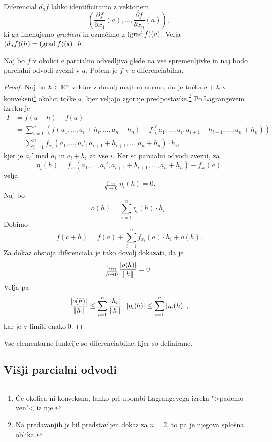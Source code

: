 \begin{opomba}
Diferencial $d_af$ lahko identificiramo z vektorjem
\[
\left(
	\frac{\partial f}{\partial x_1}(a),
	\dots,
	\frac{\partial f}{\partial x_n}(a)
\right),
\]
ki ga imenujemo \emph{gradient} in
označimo z $(\operatorname{grad} f)(a)$. Velja
$(d_af)(h) = (\operatorname{grad} f)(a) \cdot h$.
\end{opomba}

\begin{izrek}
Naj bo $f$ v okolici $a$ parcialno odvedljiva glede na vse
spremenljivke in naj bodo parcialni odvodi zvezni v $a$. Potem je
$f$ v $a$ diferenciabilna.
\end{izrek}

\begin{proof}
Naj bo $h \in \mathbb{R}^n$ vektor z dovolj majhno normo, da je točka $a+h$
v konveksni\footnote{Če okolica ni konveksna, lahko pri uporabi
Lagrangevega izreka ">pademo ven"< iz nje.} okolici točke $a$, kjer
veljajo zgornje predpostavke.\footnote{Na predavanjih je bil
predstavljen dokaz za $n=2$, to pa je njegova splošna oblika.} Po
Lagrangevem izreku je
\begin{align*}
I &= f(a+h) - f(a)
\\
&= \sum_{i=1}^n \left(
	f(a_1, \dots, a_i + h_i, \dots, a_n + h_n) - 
	f(a_1, \dots, a_i, a_{i+1} + h_{i+1}, \dots, a_n + h_n)
\right)
\\
&=\sum_{i=1}^n f_{x_i}(
	a_1, \dots, a_i', a_{i+1} + h_{i+1}, \dots, a_n + h_n
) \cdot h_i,
\end{align*}
kjer je $a_i'$ med $a_i$ in $a_i + h_i$ za vse $i$. Ker so
parcialni odvodi zvezni, za
\[
\eta_i(h) =
f_{x_i}(a_1, \dots, a_i', a_{i+1} + h_{i+1}, \dots, a_n + h_n)
- f_{x_i}(a)
\]
velja
\[
\lim_{h \to 0}\eta_i(h) = 0.
\]
Naj bo
\[
o(h) = \sum_{i=1}^n \eta_i(h) \cdot h_i.
\]
Dobimo
\[
f(a+h) = f(a) + \sum_{i=1}^n f_{x_i}(a) \cdot h_i + o(h).
\]
Za dokaz obstoja diferenciala je tako dovolj dokazati, da je
\[
\lim_{h \to 0}\frac{\left\lvert o(h)\right\rvert}{\left\lVert h\right\rVert} = 0.
\]
Velja pa
\[
\frac{\left\lvert o(h)\right\rvert}{\left\lVert h\right\rVert} \leq
\sum_{i=1}^n \frac{\left\lvert h_i\right\rvert}{\left\lVert h\right\rVert} \cdot \left\lvert \eta_i(h)\right\rvert \leq
\sum_{i=1}^n \left\lvert \eta_i(h)\right\rvert,
\]
kar je v limiti enako $0$.
\end{proof}

\begin{posledica}
Vse elementarne funkcije so diferenciabilne, kjer so definirane.
\end{posledica}

\newpage

\subsection{Višji parcialni odvodi}

